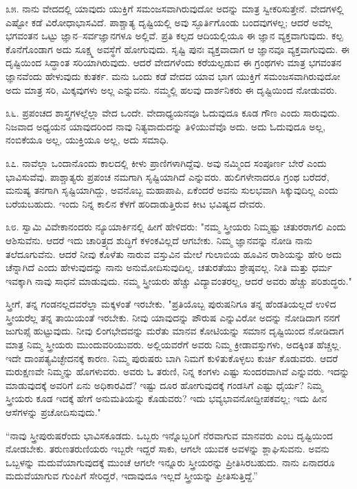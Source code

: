 ೩೫. ನಾನು ವೇದದಲ್ಲಿ ಯಾವುದು ಯುಕ್ತಿಗೆ ಸಮಂಜಸವಾಗಿರುವುದೋ ಅದನ್ನು ಮಾತ್ರ ಸ್ವೀಕರಿಸುತ್ತೇನೆ. ವೇದಗಳಲ್ಲಿ ಎಷ್ಟೋ ಕಡೆ ವಿರೋಧಾಭಾಸವಿದೆ. ಪಾಶ್ಚಾತ್ಯ ದೃಷ್ಟಿಯಲ್ಲಿ ಅವು ಸ್ಫೂರ್ತಿಗೊಂಡು ಬಂದವುಗಳಲ್ಲ; ಆದರೆ ಅವೆಲ್ಲ ಭಗವಂತನ ಒಟ್ಟು ಜ್ಞಾನ–ಸರ್ವಜ್ಞಾನಗಳೂ ಅಲ್ಲಿವೆ. ಪ್ರತಿ ಕಲ್ಪದ ಆದಿಯಲ್ಲಿಯೂ ಈ ಜ್ಞಾನ ವ್ಯಕ್ತವಾಗುವುದು. ಕಲ್ಪ ಕೊನೆಗೊಂಡಾಗ ಅದು ಸೂಕ್ಷ್ಮ ಅವಸ್ಥೆಗೆ ಹೋಗುವುದು. ಸೃಷ್ಟಿ ಪುನಃ ವ್ಯಕ್ತವಾದಾಗ ಆ ಜ್ಞಾನವೂ ವ್ಯಕ್ತವಾಗುವುದು. ಈ ದೃಷ್ಟಿಯಿಂದ ಸಿದ್ಧಾಂತ ಸರಿಯಾಗಿರುವುದು. ಆದರೆ ವೇದಗಳೆಂದು ಕರೆಯಲ್ಪಡುವ ಈ ಗ್ರಂಥಗಳು ಮಾತ್ರ ಭಗವಂತನ ಜ್ಞಾನವೆಂದು ಹೇಳುವುದು ಕುತರ್ಕ. ಮನು ಒಂದು ಕಡೆ ವೇದದ ಯಾವ ಭಾಗ ಯುಕ್ತಿಗೆ ಸಮಂಜಸವಾಗಿರುವುದೋ ಅದು ಮಾತ್ರ ಸರಿ, ಮಿಕ್ಕವುಗಳು ಅಲ್ಲ ಎನ್ನುವನು. ನಮ್ಮಲ್ಲಿ ಹಲವು ದಾರ್ಶನಿಕರು ಈ ದೃಷ್ಟಿಯಿಂದ ನೋಡುವರು.

೩೬. ಪ್ರಪಂಚದ ಶಾಸ್ತ್ರಗಳಲ್ಲೆಲ್ಲಾ ವೇದ ಒಂದೇ. ವೇದಾಧ್ಯಯನವೂ ಓದುವುದೂ ಕೂಡ ಗೌಣ ಎಂದು ಸಾರುವುದು. ನಿಜವಾದ ಅಧ್ಯಯನ ಯಾವುದರಿಂದ ನಾವು ನಿತ್ಯವಾದುದನ್ನು ತಿಳಿಯುವೆವೊ ಅದು. ಅದು ಓದುವುದೂ ಅಲ್ಲ, ನಂಬಿಕೆಯೂ ಅಲ್ಲ, ಯುಕ್ತಿಯೂ ಅಲ್ಲ, ಅದು ಸಮಾಧಿ.

೩೭. ನಾವೆಲ್ಲಾ ಒಂದಾನೊಂದು ಕಾಲದಲ್ಲಿ ಕೀಳು ಪ್ರಾಣಿಗಳಾಗಿದ್ದೆವು. ಅವು ನಮ್ಮಿಂದ ಸಂಪೂರ್ಣ ಬೇರೆ ಎಂದು ಭಾವಿಸುವೆವು. ಪಾಶ್ಚಾತ್ಯರು ಪ್ರಪಂಚ ನಮಗಾಗಿ ಸೃಷ್ಟಿಯಾಗಿದೆ ಎನ್ನುವರು. ಹುಲಿಗಳೇನಾದರೂ ಗ್ರಂಥ ಬರೆದರೆ, ಮನುಷ್ಯ ತನಗಾಗಿ ಸೃಷ್ಟಿಯಾಗಿದ್ದು, ಅವನೊಬ್ಬ ಮಹಾಪಾಪಿ, ಏಕೆಂದರೆ ಅವನು ಸುಲಭವಾಗಿ ಸಿಕ್ಕುವುದಿಲ್ಲ ಎಂದು ಬರೆಯಬಹುದು. ಇಂದು ನಿನ್ನ ಕಾಲಿನ ಕೆಳಗೆ ಹರಿದಾಡುತ್ತಿರುವ ಕೀಟ ಭವಿಷ್ಯದ ದೇವರು.

೩೮. ಸ್ವಾಮಿ ವಿವೇಕಾನಂದರು ನ್ಯೂಯಾರ್ಕಿನಲ್ಲಿ ಹೀಗೆ ಹೇಳಿದರು: "ನಮ್ಮ ಸ್ತ್ರೀಯರು ನಿಮ್ಮಷ್ಟು ಚತುರರಾಗಲಿ ಎಂದು ಆಶಿಸುವೆನು. ಆದರೆ ಇದು ಚಾರಿತ್ರ್ಯದ ಶುದ್ಧಿಗೆ ಕಳಂಕವಿಲ್ಲದೆ ಆಗಬೇಕು. ನಿಮ್ಮ ಜ್ಞಾನವನ್ನು ನೋಡಿ ನಾನು ತಲೆದೂಗುವೆನು. ಆದರೆ ನೀವು ಕೊಳೆತು ನಾರುವ ವಸ್ತುವಿನ ಮೇಲೆ ಗುಲಾಬಿಯ ಹೂವಿನ ರಾಶಿಯನ್ನು ಹೇರಿ ಅದು ಚೆನ್ನಾಗಿದೆ ಎಂದು ಹೇಳುವುದನ್ನು ನಾನು ಅನುಮೋದಿಸುವುದಿಲ್ಲ. ಚತುರತೆಯು ಶ್ರೇಷ್ಠವಲ್ಲ. ನೀತಿ ಮತ್ತು ಧರ್ಮ ಇವಕ್ಕಾಗಿ ನಾವು ಸಾಧನೆ ಮಾಡುವುದು. ನಮ್ಮ ಸ್ತ್ರೀಯರು ಹೆಚ್ಚು ವಿದ್ಯಾವಂತರಲ್ಲ, ಆದರೆ ಅವರು ಹೆಚ್ಚು ಪರಿಶುದ್ಧರು."

ಸ್ತ್ರೀಗೆ, ತನ್ನ ಗಂಡನಲ್ಲದವರೆಲ್ಲಾ ಮಕ್ಕಳಂತೆ ಇರಬೇಕು. "ಪ್ರತಿಯೊಬ್ಬ ಪುರುಷನಿಗೂ ತನ್ನ ಹೆಂಡತಿಯಲ್ಲದೆ ಉಳಿದ ಸ್ತ್ರೀಯರೆಲ್ಲ ತನ್ನ ತಾಯಿಯಂತೆ ಇರಬೇಕು. ನೀವು ಯಾವುದನ್ನು ಪೌರುಷ  ಎನ್ನುವಿರೋ ಅದನ್ನು ನೋಡಿದಾಗ ನನಗೆ ಜುಗುಪ್ಸೆ ಹುಟ್ಟುವುದು. ನೀವು ಲಿಂಗಭೇದವನ್ನು ಮರೆತು ಮಾನವ ಕೋಟಿಯನ್ನು ಸಮಾನ ದೃಷ್ಟಿಯಿಂದ ನೋಡಿದಾಗ ಮಾತ್ರ ನಿಮ್ಮ ಸ್ತ್ರೀಯರು ಮುಂದುವರಿಯುವರು. ಅಲ್ಲಿಯವರೆಗೆ ಅವರು ನಿಮ್ಮ ಕ್ರೀಡಾವಸ್ತುಗಳು, ಅದಕ್ಕಿಂತ ಹೆಚ್ಚಲ್ಲ. ಇದೇ ದಾಂಪತ್ಯವಿಚ್ಛೇದನಕ್ಕೆ ಕಾರಣ. ನಿಮ್ಮ ಪುರುಷರು ಬಾಗಿ ನಿಮಗೆ ಕುಳಿತುಕೊಳ್ಳಲು ಕುರ್ಚಿ ಕೊಡುವರು. ಆದರೆ ಮರುಕ್ಷಣವೇ ನಿಮ್ಮನ್ನು ಹೊಗಳುವರು. ಅವರು ಓ ತರುಣಿ, ನಿನ್ನ ಕಂಗಳು ಎಷ್ಟು ಸುಂದರವಾಗಿವೆ ಎನ್ನುವರು. ಇದನ್ನು ಮಾಡುವುದಕ್ಕೆ ಅವರಿಗೆ ಏನು ಅಧಿಕಾರವಿದೆ? ಇಷ್ಟು ದೂರ ಹೋಗುವುದಕ್ಕೆ ಗಂಡಸಿಗೆ ಎಷ್ಟು ಧೈರ್ಯ? ನಿಮ್ಮ ಸ್ತ್ರೀಯರು ಕೂಡ ಇದಕ್ಕೆ ಹೇಗೆ ಅನುಮತಿಯನ್ನು ಕೊಡುವರು? ಇದು ಭವ್ಯಭಾವನೋದ್ದೀಪಕವಲ್ಲ; ಇದು ಹೀನ ಆಸೆಗಳನ್ನು ಪ್ರಚೋದಿಸುವುದು."

“ನಾವು ಸ್ತ್ರೀಪುರುಷರೆಂದು ಭಾವಿಸಕೂಡದು. ಒಬ್ಬರು ಇನ್ನೊಬ್ಬರಿಗೆ ನೆರವಾಗುವ ಮಾನವರು ಎಂಬ ದೃಷ್ಟಿಯಿಂದ ನೋಡಬೇಕು. ತರುಣತರುಣಿಯರು ಇಬ್ಬರೇ ಇದ್ದರೆ ಸಾಕು, ಆಗಲೇ ಯುವಕ ಅವಳನ್ನು ಶ್ಲಾಘಿಸುವನು. ಅವನು ಒಬ್ಬಳನ್ನು ಮದುವೆಯಾಗುವುದಕ್ಕೆ ಮುಂಚೆ ಆಗಲೇ ಇನ್ನೂರು ಸ್ತ್ರೀಯರನ್ನು ಪ್ರೀತಿಸಿರಬಹುದು. ನಾನು ಏನಾದರೂ ಮದುವೆಯಾಗುವ ಗುಂಪಿಗೆ ಸೇರಿದ್ದರೆ, ಇದಾವುದೂ ಇಲ್ಲದೆ ಸ್ತ್ರೀಯನ್ನು ಪ್ರೀತಿಸುತ್ತಿದ್ದೆ.”


